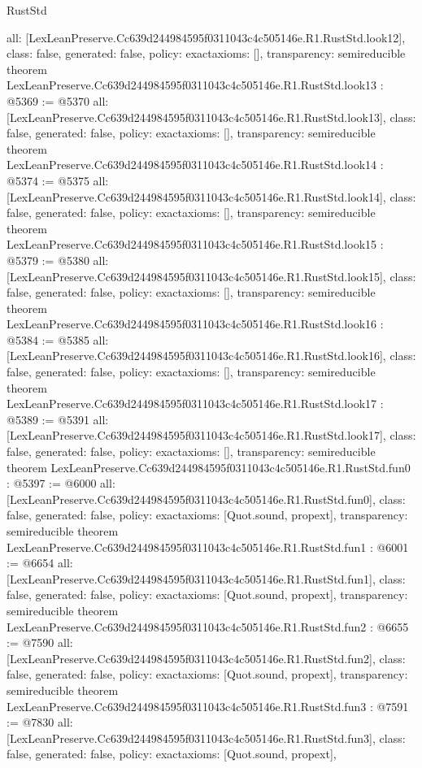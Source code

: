 \begin{lexlean}{RustStd}
\begin{coremodule}
{  all: [LexLeanPreserve.Cc639d244984595f0311043c4c505146e.R1.RustStd.look12],
  class: false,
  generated: false,
  policy: exact{axioms: []},
  transparency: semireducible
}
theorem LexLeanPreserve.Cc639d244984595f0311043c4c505146e.R1.RustStd.look13 : @5369 := @5370 {
  all: [LexLeanPreserve.Cc639d244984595f0311043c4c505146e.R1.RustStd.look13],
  class: false,
  generated: false,
  policy: exact{axioms: []},
  transparency: semireducible
}
theorem LexLeanPreserve.Cc639d244984595f0311043c4c505146e.R1.RustStd.look14 : @5374 := @5375 {
  all: [LexLeanPreserve.Cc639d244984595f0311043c4c505146e.R1.RustStd.look14],
  class: false,
  generated: false,
  policy: exact{axioms: []},
  transparency: semireducible
}
theorem LexLeanPreserve.Cc639d244984595f0311043c4c505146e.R1.RustStd.look15 : @5379 := @5380 {
  all: [LexLeanPreserve.Cc639d244984595f0311043c4c505146e.R1.RustStd.look15],
  class: false,
  generated: false,
  policy: exact{axioms: []},
  transparency: semireducible
}
theorem LexLeanPreserve.Cc639d244984595f0311043c4c505146e.R1.RustStd.look16 : @5384 := @5385 {
  all: [LexLeanPreserve.Cc639d244984595f0311043c4c505146e.R1.RustStd.look16],
  class: false,
  generated: false,
  policy: exact{axioms: []},
  transparency: semireducible
}
theorem LexLeanPreserve.Cc639d244984595f0311043c4c505146e.R1.RustStd.look17 : @5389 := @5391 {
  all: [LexLeanPreserve.Cc639d244984595f0311043c4c505146e.R1.RustStd.look17],
  class: false,
  generated: false,
  policy: exact{axioms: []},
  transparency: semireducible
}
theorem LexLeanPreserve.Cc639d244984595f0311043c4c505146e.R1.RustStd.fun0 : @5397 := @6000 {
  all: [LexLeanPreserve.Cc639d244984595f0311043c4c505146e.R1.RustStd.fun0],
  class: false,
  generated: false,
  policy: exact{axioms: [Quot.sound, propext]},
  transparency: semireducible
}
theorem LexLeanPreserve.Cc639d244984595f0311043c4c505146e.R1.RustStd.fun1 : @6001 := @6654 {
  all: [LexLeanPreserve.Cc639d244984595f0311043c4c505146e.R1.RustStd.fun1],
  class: false,
  generated: false,
  policy: exact{axioms: [Quot.sound, propext]},
  transparency: semireducible
}
theorem LexLeanPreserve.Cc639d244984595f0311043c4c505146e.R1.RustStd.fun2 : @6655 := @7590 {
  all: [LexLeanPreserve.Cc639d244984595f0311043c4c505146e.R1.RustStd.fun2],
  class: false,
  generated: false,
  policy: exact{axioms: [Quot.sound, propext]},
  transparency: semireducible
}
theorem LexLeanPreserve.Cc639d244984595f0311043c4c505146e.R1.RustStd.fun3 : @7591 := @7830 {
  all: [LexLeanPreserve.Cc639d244984595f0311043c4c505146e.R1.RustStd.fun3],
  class: false,
  generated: false,
  policy: exact{axioms: [Quot.sound, propext]},
}
\end{coremodule}
\end{lexlean}
